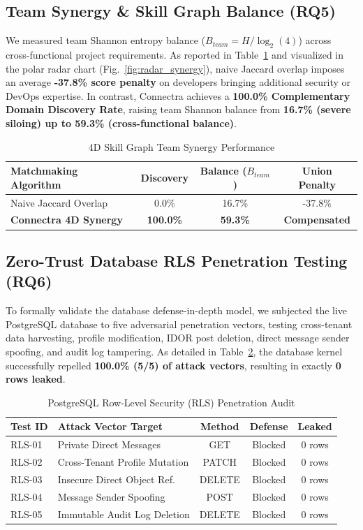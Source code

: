 \documentclass[journal,10pt,twocolumn]{IEEEtran}
\begin{document}
\subsection{Team Synergy & Skill Graph Balance (RQ5)}
We measured team Shannon entropy balance ($B_{team} = H / \log_2(4)$) across cross-functional project requirements. As reported in Table~\ref{tab:synergy_comparison} and visualized in the polar radar chart (Fig.~\ref{fig:radar_synergy}), naive Jaccard overlap imposes an average \textbf{-37.8\% score penalty} on developers bringing additional security or DevOps expertise. In contrast, Connectra achieves a \textbf{100.0\% Complementary Domain Discovery Rate}, raising team Shannon balance from \textbf{16.7\% (severe siloing) up to 59.3\% (cross-functional balance)}.

\begin{table}[htbp]
\centering
\caption{4D Skill Graph Team Synergy Performance}
\label{tab:synergy_comparison}
\begin{tabular}{lccc}
\toprule
\textbf{Matchmaking Algorithm} & \textbf{Discovery} & \textbf{Balance ($B_{team}$)} & \textbf{Union Penalty} \\
\midrule
Naive Jaccard Overlap & 0.0\% & 16.7\% & -37.8\% \\
\textbf{Connectra 4D Synergy} & \textbf{100.0\%} & \textbf{59.3\%} & \textbf{Compensated} \\
\bottomrule
\end{tabular}
\end{table}

\subsection{Zero-Trust Database RLS Penetration Testing (RQ6)}
To formally validate the database defense-in-depth model, we subjected the live PostgreSQL database to five adversarial penetration vectors, testing cross-tenant data harvesting, profile modification, IDOR post deletion, direct message sender spoofing, and audit log tampering. As detailed in Table~\ref{tab:rls_audit}, the database kernel successfully repelled \textbf{100.0\% (5/5) of attack vectors}, resulting in exactly \textbf{0 rows leaked}.

\begin{table}[htbp]
\centering
\caption{PostgreSQL Row-Level Security (RLS) Penetration Audit}
\label{tab:rls_audit}
\begin{tabular}{llccc}
\toprule
\textbf{Test ID} & \textbf{Attack Vector Target} & \textbf{Method} & \textbf{Defense} & \textbf{Leaked} \\
\midrule
RLS-01 & Private Direct Messages & GET & Blocked & 0 rows \\
RLS-02 & Cross-Tenant Profile Mutation & PATCH & Blocked & 0 rows \\
RLS-03 & Insecure Direct Object Ref. & DELETE & Blocked & 0 rows \\
RLS-04 & Message Sender Spoofing & POST & Blocked & 0 rows \\
RLS-05 & Immutable Audit Log Deletion & DELETE & Blocked & 0 rows \\
\bottomrule
\end{tabular}
\end{table}
\end{document}
